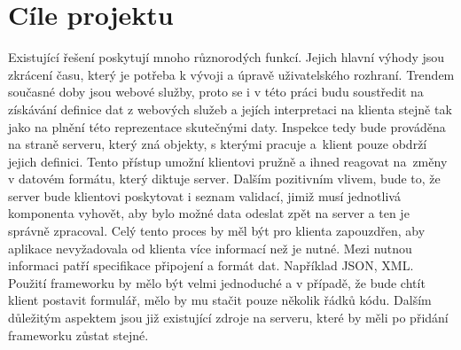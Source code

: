 \section{Cíle projektu}
Existující řešení poskytují mnoho různorodých funkcí. Jejich hlavní výhody jsou zkrácení času, který je potřeba k vývoji a úpravě uživatelského rozhraní. Trendem současné doby jsou webové služby, proto se i v této práci budu soustředit na získávání definice dat z webových služeb a jejích interpretaci na klienta stejně tak jako na plnění této reprezentace skutečnými daty. Inspekce tedy bude prováděna na straně serveru, který zná objekty, s kterými pracuje a~klient pouze obdrží jejich definici. Tento přístup umožní klientovi pružně a ihned reagovat na~změny v datovém formátu, který diktuje server. Dalším pozitivním vlivem, bude to, že server bude klientovi poskytovat i seznam validací, jimiž musí jednotlivá komponenta vyhovět, aby bylo možné data odeslat zpět na server a ten je správně zpracoval. Celý tento proces by měl být pro klienta zapouzdřen, aby aplikace nevyžadovala od klienta více informací než je nutné. Mezi nutnou informaci patří specifikace připojení a formát dat. Například JSON, XML. Použití frameworku by mělo být velmi jednoduché a v případě, že bude chtít klient postavit formulář, mělo by mu stačit pouze několik řádků kódu. Dalším důležitým aspektem jsou již existující zdroje na serveru, které by měli po přidání frameworku zůstat stejné. 